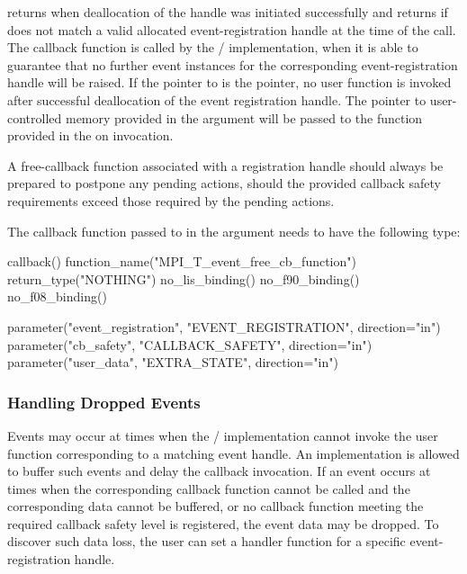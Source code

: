  returns  when
deallocation of the handle was initiated successfully and returns
 if  does
not match a valid allocated event-registration handle at the time of the call.
The callback function  is called by the \MPI/
implementation, when it is able to guarantee that no further event
instances for the corresponding event-registration handle will be raised.  If
the pointer to  is the  pointer, no
user function is invoked after successful deallocation of the event
registration handle. The pointer to user-controlled memory provided in the
 argument will be passed to the function provided in the
 on invocation.

\begin{users}
    A free-callback function associated with a registration handle should
    always be prepared to postpone any pending actions, should the provided
    callback safety requirements exceed those required by the pending
    actions.
\end{users}


The callback function passed to  in
the argument  needs to have the following
type:

\begin{mpi-binding}
    callback()
    function_name("MPI_T_event_free_cb_function")
    return_type("NOTHING")
    no_lis_binding()
    no_f90_binding()
    no_f08_binding()

    parameter("event_registration", "EVENT_REGISTRATION", direction="in")
    parameter("cb_safety", "CALLBACK_SAFETY", direction="in")
    parameter("user_data", "EXTRA_STATE", direction="in")
\end{mpi-binding}

\subsubsection{Handling Dropped Events}
\label{sec:tools:mpit:droppedevents}

Events may occur at times when the \MPI/ implementation cannot invoke
the user function corresponding to a matching event handle.
An implementation is allowed to buffer such events and delay
the callback invocation. If an event occurs at times when
the corresponding callback function cannot be called and the
corresponding data cannot be buffered,
or no callback function meeting the required callback safety level is registered,
the event data may be
dropped. 
To discover such data loss, the user can set a handler
function for a specific event-registration handle.

